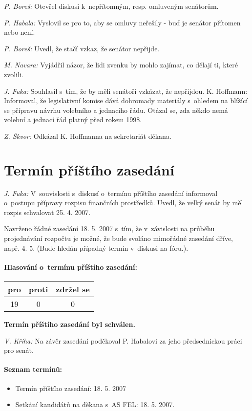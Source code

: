 \documentclass[a4paper,12pt,notitlepage,oneside]{article}
\newcommand{\hlasovani}[3]{\begin{center}
\begin{tabular}{|c|c|c|}\hline
pro& proti & zdržel se \\ \hline
#1 & #2 & #3 \\ \hline
\end{tabular}
\end{center}}
\begin{document}
\textit{P. Boreš:} Otevřel diskusi k~nepřítomným, resp. omluveným senátorům.

\textit{P. Habala:} Vyslovil se pro to, aby se omluvy neřešily - buď je senátor přítomen nebo není.

\textit{P. Boreš:} Uvedl, že stačí vzkaz, že senátor nepřijde.

\textit{M. Navara:} Vyjádřil názor, že lidi zvenku by mohlo zajímat, co dělají ti, které zvolili.

\textit{J. Fuka:} Souhlasil s~tím, že by měli senátoři vzkázat, že nepřijdou.
K. Hoffmann: Informoval, že legislativní komise dává dohromady materiály s~ohledem na blížící se přípravu návrhu volebního a jednacího řádu. Otázal se, zda někdo nemá volební a jednací řád platný před rokem 1998.

\textit{Z. Škvor:} Odkázal K. Hoffmanna na sekretariát děkana.

\section{Termín příštího zasedání}
\textit{J. Fuka:} V~souvislosti s~diskusí o~termínu příštího zasedání informoval o~postupu přípravy rozpisu finančních prostředků. Uvedl, že velký senát by měl rozpis schvalovat 25. 4. 2007.

Navrženo řádné zasedání 18. 5. 2007 s~tím, že v~závislosti na průběhu projednávání rozpočtu je možné, že bude svoláno mimořádné zasedání dříve, např. 4. 5. (Bude hledán případný termín v~diskusi na fóru.).

\paragraph{Hlasování o~termínu příštího zasedání:}
\hlasovani{19}{0}{0}
\textbf{Termín příštího zasedání byl schválen. }

\textit{V. Kříha:} Na závěr zasedání poděkoval P. Habalovi za jeho předsednickou práci pro senát.


\paragraph{Seznam termínů:}
\begin{itemize}
\item Termín příštího zasedání: 18. 5. 2007
\item Setkání kandidátů na děkana s~AS FEL: 18. 5. 2007.
\end{itemize}
\end{document}
